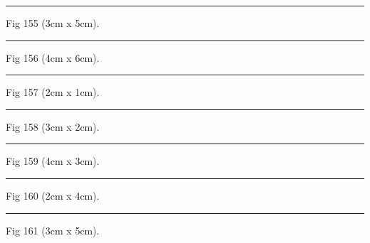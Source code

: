 \documentclass[a4paper,11pt]{article}
\begin{document}
\begin{swarmwrap}%
  \begin{minipage}[t]{3cm}
    \centering
    \rule{\linewidth}{5cm}
    {\footnotesize Fig 155 (3cm x 5cm).}
  \end{minipage}%
\end{swarmwrap}%
\swarmwrapnext
\lipsum[5]%

\begin{swarmwrap}%
  \begin{minipage}[t]{4cm}
    \centering
    \rule{\linewidth}{6cm}
    {\footnotesize Fig 156 (4cm x 6cm).}
  \end{minipage}%
\end{swarmwrap}%
\swarmwrapnext
\lipsum[6]%

\begin{swarmwrap}%
  \begin{minipage}[t]{2cm}
    \centering
    \rule{\linewidth}{1cm}
    {\footnotesize Fig 157 (2cm x 1cm).}
  \end{minipage}%
\end{swarmwrap}%
\swarmwrapnext
\lipsum[7]%

\begin{swarmwrap}%
  \begin{minipage}[t]{3cm}
    \centering
    \rule{\linewidth}{2cm}
    {\footnotesize Fig 158 (3cm x 2cm).}
  \end{minipage}%
\end{swarmwrap}%
\swarmwrapnext
\lipsum[8]%

\begin{swarmwrap}%
  \begin{minipage}[t]{4cm}
    \centering
    \rule{\linewidth}{3cm}
    {\footnotesize Fig 159 (4cm x 3cm).}
  \end{minipage}%
\end{swarmwrap}%
\swarmwrapnext
\lipsum[9]%

\begin{swarmwrap}%
  \begin{minipage}[t]{2cm}
    \centering
    \rule{\linewidth}{4cm}
    {\footnotesize Fig 160 (2cm x 4cm).}
  \end{minipage}%
\end{swarmwrap}%
\swarmwrapnext
\lipsum[10]%

\begin{swarmwrap}%
  \begin{minipage}[t]{3cm}
    \centering
    \rule{\linewidth}{5cm}
    {\footnotesize Fig 161 (3cm x 5cm).}
  \end{minipage}%
\end{swarmwrap}%
\swarmwrapnext
\lipsum[11]%
\end{document}
